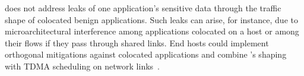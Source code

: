 
{\sys} does not address leaks of one application's sensitive data through the
traffic shape of colocated benign applications.
Such leaks can arise, for instance, due to microarchitectural interference among
applications colocated on a host or among their flows if they pass through
shared links.
End hosts could implement orthogonal mitigations against colocated
applications \cite{mehta2022pacer,
shi2011limiting,
varadarajan2014scheduler, braun2015robust}
and combine
{\sys}'s shaping with TDMA scheduling on network
links~\cite{beams2021ifs, vattikonda2012tdma}.



